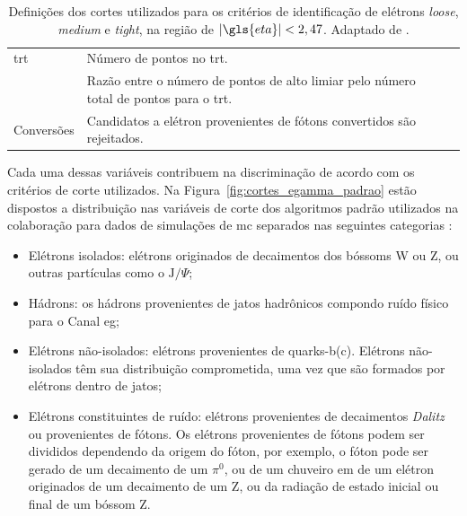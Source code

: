 \begin{table}[p]
{\begin{tabular}{p{4cm}p{9cm}c}
\hline
\gls{trt} & Número de pontos no \gls{trt}. & \\
 & Razão entre o número de pontos de alto limiar pelo número total de pontos para o
\gls{trt}. & \\
\hline
Conversões & Candidatos a elétron provenientes de fótons convertidos são
rejeitados. & \\
\hline
\hline
\end{tabular}
}
\caption[Definições dos cortes utilizados para os critérios de identificação de elétrons \emph{loose}, \emph{medium}
e \emph{tight}, na região de $|\eta|<2,47$]
{Definições dos cortes utilizados para os critérios de identificação de elétrons \emph{loose}, \emph{medium}
e \emph{tight}, na região de $|\gls{eta}|<2,47$. Adaptado de \cite{expected_perf_2011}.}
\label{tab:cortes_em}
\end{table}

Cada uma dessas variáveis contribuem na discriminação de acordo com os critérios
de corte utilizados. Na Figura~\ref{fig:cortes_egamma_padrao} estão dispostos a
distribuição nas variáveis de corte dos algoritmos padrão utilizados na
colaboração para dados de simulações de \gls{mc} separados nas seguintes 
categorias \cite{expected_perf_2011}:

\begin{itemize}
\item Elétrons isolados: elétrons originados de decaimentos dos
bóssoms W ou Z, ou outras partículas como o $\text{J}/\Psi$;
\item Hádrons: os hádrons provenientes de
jatos hadrônicos compondo ruído físico para o Canal \gls{eg};
\item Elétrons não-isolados: elétrons
provenientes de quarks-b(c). Elétrons não-isolados têm sua distribuição
comprometida, uma vez que são formados por elétrons dentro de jatos;
\item Elétrons constituintes de ruído: elétrons
provenientes de decaimentos \emph{Dalitz} ou provenientes de fótons. Os elétrons
provenientes de fótons podem ser divididos dependendo da origem do fóton, por
exemplo, o fóton pode ser gerado de um decaimento de um $\pi^0$, ou de um
chuveiro \gls{em} de um elétron originados de um decaimento de um Z, ou da
radiação de estado inicial ou final de um bóssom Z.
\end{itemize}

